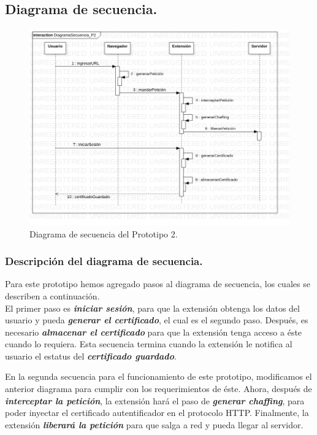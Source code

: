 \documentclass[12pt, a4paper, titlepage]{report}
\begin{document}
        \subsection{Diagrama de secuencia.}       
           \begin{figure}[H]
				\begin{center}
		    	\includegraphics[width=15cm]{./imagenes/Desarrollo/Prototipo_2/SD_P2.png}
				\caption{Diagrama de secuencia del Prototipo 2.}
				\end{center}
			\end{figure}
			
			\subsubsection{Descripción del diagrama de secuencia.}
			
			Para este prototipo hemos agregado pasos al diagrama de secuencia, los cuales se describen a continuación.\\
			El primer paso es \textit{\textbf{iniciar sesión}}, para que la extensión obtenga los datos del usuario y pueda \textit{\textbf{generar el certificado}}, el cual es el segundo paso. Después, es necesario \textit{\textbf{almacenar el certificado}} para que la extensión tenga acceso a éste cuando lo requiera. Esta secuencia termina cuando la extensión le notifica al usuario el estatus del \textit{\textbf{certificado guardado}}.
			
			En la segunda secuencia para el funcionamiento de este prototipo, modificamos el anterior diagrama para cumplir con los requerimientos de éste. Ahora, después de \textit{\textbf{interceptar la petición}}, la extensión hará el paso de \textit{\textbf{generar chaffing}}, para poder inyectar el certificado autentificador en el protocolo HTTP. Finalmente, la extensión \textit{\textbf{liberará la petición}} para que salga a red y pueda llegar al servidor.
			
\end{document}
